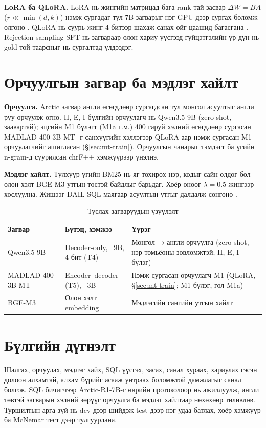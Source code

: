 \textbf{LoRA ба QLoRA.} LoRA нь жингийн матрицад бага rank-тай засвар $\Delta W = BA$ ($r \ll \min(d,k)$) нэмж сургадаг тул
7B загварыг нэг GPU дээр сургах боломж олгоно \cite{hu_2022_lora}. QLoRA нь суурь жинг 4 битээр шахаж санах ойг цаашид
багасгана \cite{dettmers_2023_qlora}. Rejection sampling SFT нь загвараар олон хариу үүсгээд гүйцэтгэлийн үр дүн нь
gold-той таарсныг нь сургалтад үлдээдэг.

\section{Орчуулгын загвар ба мэдлэг хайлт}
\label{sec:mt-model}

\textbf{Орчуулга.} Arctic загвар англи өгөгдлөөр сургагдсан тул монгол асуултыг англи руу орчуулж өгнө. H, E, I
бүлгийн орчуулагч нь Qwen3.5-9B (zero-shot, заавартай); эцсийн M1 бүлэгт (M1a г.м.) 400 гаруй хэлний өгөгдлөөр сургасан
MADLAD-400-3B-MT \cite{kudugunta_2023_madlad}-г санхүүгийн хэллэгээр QLoRA-аар нэмж сургасан M1 орчуулагчийг ашигласан
(§\ref{sec:mt-train}). Орчуулгын чанарыг тэмдэгт ба үгийн n-gram-д суурилсан chrF++ хэмжүүрээр
\cite{popovic_2017_chrfpp} үнэлнэ.

\textbf{Мэдлэг хайлт.} Түлхүүр үгийн BM25 \cite{robertson_2009_bm25} нь яг тохирох нэр, кодыг сайн олдог бол олон хэлт
BGE-M3 \cite{chen_2024_bge_m3} утгын төстэй байдлыг барьдаг. Хоёр оноог $\lambda = 0.5$ жингээр хослуулна. Жишээг
DAIL-SQL маягаар асуултын утгыг далдалж сонгоно \cite{gao_2024_dail_sql}.

\begin{table}[H]
\centering\small
\caption{Туслах загваруудын үзүүлэлт}
\label{tab:aux-models}
\begin{tabularx}{\textwidth}{p{3.2cm}p{3.6cm}X}
\toprule
Загвар & Бүтэц, хэмжээ & Үүрэг \\
\midrule
Qwen3.5-9B & Decoder-only, ~9B, 4 бит (T4) & Монгол → англи орчуулга (zero-shot, нэр томьёоны зөвлөмжтэй; H, E, I бүлэг) \\
MADLAD-400-3B-MT & Encoder--decoder (T5), ~3B & Нэмж сургасан орчуулагч M1 (QLoRA, §\ref{sec:mt-train}; M1 бүлэг, гол M1a) \\
BGE-M3 & Олон хэлт embedding & Мэдлэгийн сангийн утгын хайлт \\
\bottomrule
\end{tabularx}
\end{table}

\section{Бүлгийн дүгнэлт}
\label{sec:ch3-summary}

Шалгах, орчуулах, мэдлэг хайх, SQL үүсгэх, засах, санал хураах, хариулах гэсэн долоон алхамтай, алхам бүрийг асааж
унтраах боломжтой дамжлагыг санал болгов. SQL бичигчээр Arctic-R1-7B-г өөрийн протоколоор нь ажиллуулж, англи төвтэй
загварын хэлний зөрүүг орчуулга ба мэдлэг хайлтаар нөхөхөөр төлөвлөв. Туршилтын арга зүй нь dev дээр шийдэж test дээр нэг
удаа батлах, хоёр хэмжүүр ба McNemar тест дээр тулгуурлана.
